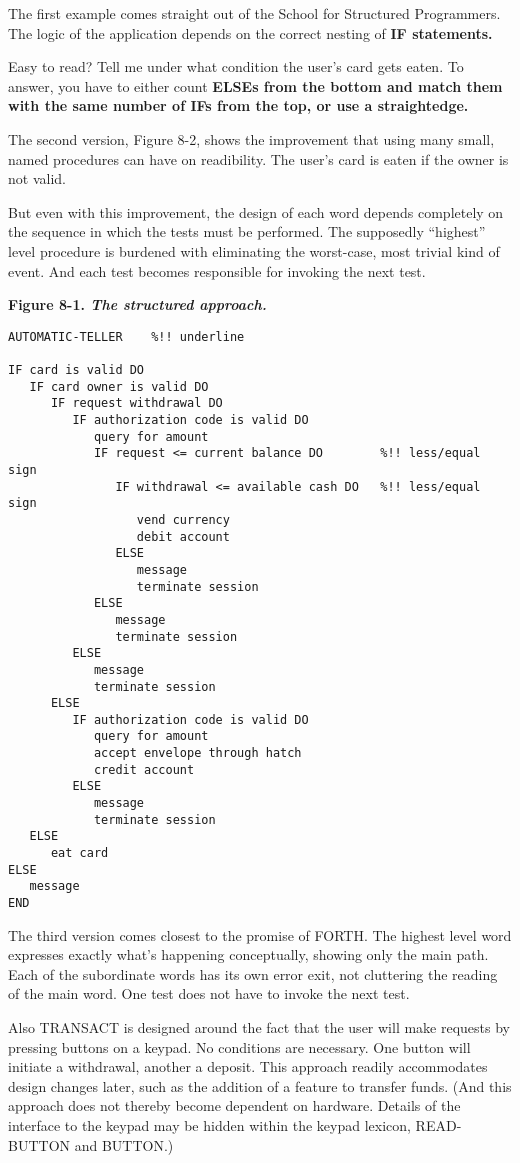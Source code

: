 The first example comes straight out of the School for Structured
Programmers. The logic of the application depends on the correct nesting
of \bf{IF} statements.

Easy to read? Tell me under what condition the user's card gets
eaten. To answer, you have to either count \bf{ELSE}s from the bottom and
match them with the same number of \bf{IF}s from the top, or use a
straightedge.

The second version, Figure 8-2, shows the improvement that using
many small, named procedures can have on readibility. The user's card is
eaten if the owner is not valid.

But even with this improvement, the design of each word depends
completely on the sequence in which the tests must be performed. The
supposedly ``highest'' level procedure is burdened with eliminating the
worst-case, most trivial kind of event. And each test becomes responsible
for invoking the next test.

\bf{Figure 8-1.} \emph{The structured approach.}

\begin{verbatim}
AUTOMATIC-TELLER	%!! underline

IF card is valid DO
   IF card owner is valid DO
      IF request withdrawal DO
         IF authorization code is valid DO
            query for amount
            IF request <= current balance DO		%!! less/equal sign
               IF withdrawal <= available cash DO	%!! less/equal sign
                  vend currency
                  debit account
               ELSE
                  message
                  terminate session
            ELSE
               message
               terminate session
         ELSE
            message
            terminate session
      ELSE
         IF authorization code is valid DO
            query for amount
            accept envelope through hatch
            credit account
         ELSE
            message
            terminate session
   ELSE
      eat card
ELSE
   message
END
\end{verbatim}

The third version comes closest to the promise of FORTH. The
highest level word expresses exactly what's happening conceptually,
showing only the main path. Each of the subordinate words has its own
error exit, not cluttering the reading of the main word. One test does not
have to invoke the next test.

Also TRANSACT is designed around the fact that the user will
make requests by pressing buttons on a keypad. No conditions are
necessary. One button will initiate a withdrawal, another a deposit. This
approach readily accommodates design changes later, such as the addition
of a feature to transfer funds. (And this approach does not thereby
become dependent on hardware. Details of the interface to the keypad
may be hidden within the keypad lexicon, READ-BUTTON and
BUTTON.)

